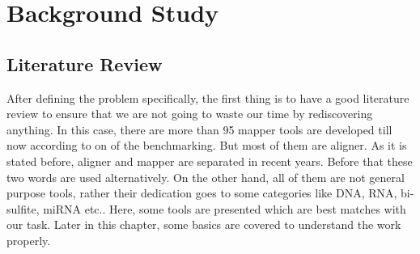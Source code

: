 \documentclass{standalone}
\begin{document}
\chapter{Background Study}
\section{Literature Review}
After defining the problem specifically, the first thing is to have a good literature review to ensure that we are not going to waste our time by rediscovering anything. In this case, there are more than 95 mapper tools are developed till now according to on of the benchmarking\cite{mapperBenchmark}. But most of them are aligner. As it is stated before, aligner and mapper are separated in recent years. Before that these two words are used alternatively. On the other hand, all of them are not general purpose tools, rather their dedication goes to some categories like DNA, RNA, bi-sulfite, miRNA etc.\cite{mapperBenchmark}. Here, some tools are presented which are best matches with our task. Later in this chapter, some basics are covered to understand the work properly.
\end{document}
